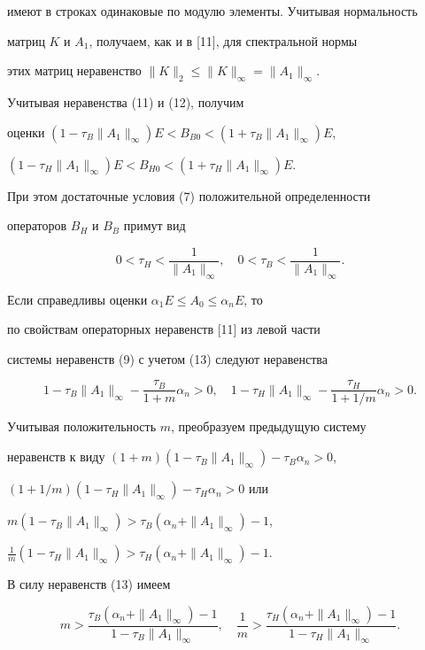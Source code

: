имеют в строках одинаковые по модулю элементы. Учитывая нормальность 


матриц $K$ и $A_1$, получаем, как и в [11], для спектральной нормы 


этих матриц неравенство $\|K\|_2\le\|K\|_\infty=\|A_1\|_\infty$. 


 


Учитывая неравенства (11) и (12), получим 


оценки $(1-\tau_B\|A_1\|_\infty)E<B_{B0}<(1+\tau_B\|A_1\|_\infty)E$, 


$(1-\tau_H\|A_1\|_\infty)E<B_{H0}<(1+\tau_H\|A_1\|_\infty)E$. 


При этом достаточные условия (7) положительной определенности  


операторов $B_H$ и $B_B$ примут вид 


\begin{equation} 


0<\tau_H<\frac{1}{\|A_1\|_\infty},\quad 


0<\tau_B<\frac{1}{\|A_1\|_\infty}. 


\end{equation} 


 


Если справедливы оценки $\alpha_1E\le A_0\le\alpha_n E$, то 


по свойствам операторных неравенств [11] из левой части  


системы неравенств (9) с учетом (13) следуют неравенства 


$$ 


1-\tau_B\|A_1\|_\infty-\frac{\tau_B}{1+m}\alpha_n>0,\quad 


1-\tau_H\|A_1\|_\infty-\frac{\tau_H}{1+1/m}\alpha_n>0. 


$$ 


Учитывая положительность $m$, преобразуем предыдущую систему  


неравенств к виду $(1+m)(1-\tau_B\|A_1\|_\infty)-\tau_B\alpha_n>0$, 


$(1+1/m)(1-\tau_H\|A_1\|_\infty)-\tau_H\alpha_n>0$ или 


$m(1-\tau_B\|A_1\|_\infty)>\tau_B(\alpha_n+\|A_1\|_\infty)-1$, 


$\frac{1}{m}(1-\tau_H\|A_1\|_\infty)>\tau_H(\alpha_n+\|A_1\|_\infty)-1$. 


В силу неравенств (13) имеем 


\begin{equation} 


m>\frac{\tau_B(\alpha_n+\|A_1\|_\infty)-1} 


{1-\tau_B\|A_1\|_\infty},\quad 


\frac{1}{m}>\frac{\tau_H(\alpha_n+\|A_1\|_\infty)-1} 


{1-\tau_H\|A_1\|_\infty}. 


\end{equation} 


